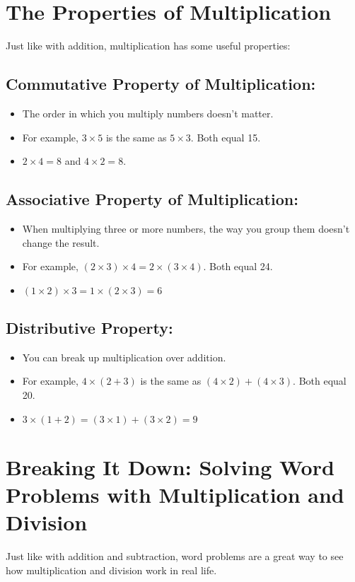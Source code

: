 \section{The Properties of Multiplication}
Just like with addition, multiplication has some useful properties:

\subsection{Commutative Property of Multiplication:}
\begin{itemize}
    \item The order in which you multiply numbers doesn’t matter.
    \item For example, $3 \times 5$ is the same as $5 \times 3$. Both equal 15.
    \item $2 \times 4 = 8$ and $4 \times 2 = 8$.
\end{itemize}

\subsection{Associative Property of Multiplication:}
\begin{itemize}
    \item When multiplying three or more numbers, the way you group them doesn’t change the result.
    \item For example, $(2 \times 3) \times 4 = 2 \times (3 \times 4)$. Both equal 24.
    \item $(1 \times 2) \times 3 = 1 \times (2 \times 3) = 6$
\end{itemize}

\subsection{Distributive Property:}
\begin{itemize}
    \item You can break up multiplication over addition.
    \item For example, $4 \times (2 + 3)$ is the same as $(4 \times 2) + (4 \times 3)$. Both equal 20.
    \item $3 \times (1 + 2) = (3 \times 1) + (3 \times 2) = 9$
\end{itemize}

\section{Breaking It Down: Solving Word Problems with Multiplication and Division}
Just like with addition and subtraction, word problems are a great way to see how multiplication and division work in real life.

